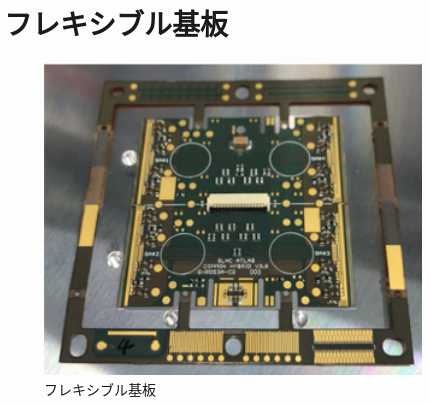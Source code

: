 \section{フレキシブル基板}
\begin{figure}[bpt]\centering
\includegraphics[width=10cm]{./pcb.png}
\caption[フレキシブル基板]{フレキシブル基板}
\label{pcb}
\end{figure}



